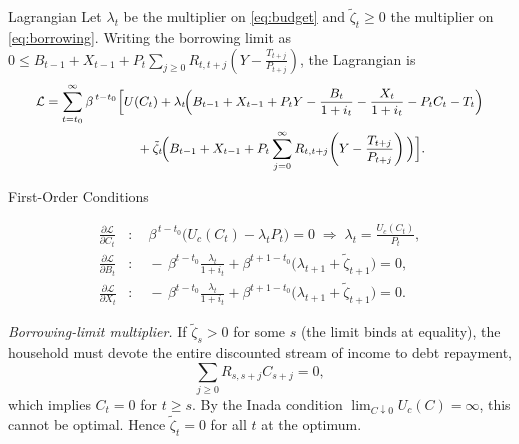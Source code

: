 \documentclass[11pt,aspectratio=169]{beamer}
\begin{document}
\begin{frame}{Lagrangian}
Let $\lambda_t$ be the multiplier on \eqref{eq:budget} and $\tilde{\zeta}_t \ge 0$ the multiplier on \eqref{eq:borrowing}.
Writing the borrowing limit as $0 \le B_{t-1} + X_{t-1} + P_t \sum_{j\ge 0} R_{t,t+j}\!\left(Y-\frac{T_{t+j}}{P_{t+j}}\right)$,
the Lagrangian is
\begin{equation} \label{eq:lagrangian}
\small
\begin{aligned}
\mathcal{L} 
= \sum_{t=t_0}^{\infty} \beta^{\,t-t_0}\Big[ & U(C_t) 
+ \lambda_t \!\Big(B_{t-1}+X_{t-1}+P_t Y - \frac{B_t}{1+i_t} - \frac{X_t}{1+i_t} - P_t C_t - T_t \Big) \\
&\quad + \tilde{\zeta}_t \!\Big( B_{t-1} + X_{t-1} 
+ P_t \sum_{j=0}^{\infty} R_{t,t+j} \!\left( Y - \frac{T_{t+j}}{P_{t+j}} \right) \Big) \Big].
\end{aligned}
\end{equation}
\end{frame}

\begin{frame}{First-Order Conditions}
\small

\begin{align}
\frac{\partial \mathcal{L}}{\partial C_t} &: \quad 
\beta^{\,t-t_0}\!\big(U_c(C_t)-\lambda_t P_t\big)=0 
\;\Rightarrow\;
\lambda_t=\frac{U_c(C_t)}{P_t}, 
\label{eq:foc_c}\\[1mm]
\frac{\partial \mathcal{L}}{\partial B_t} &: \quad 
-\,\beta^{t-t_0}\frac{\lambda_t}{1+i_t}
+\beta^{t+1-t_0}\big(\lambda_{t+1}+\tilde{\zeta}_{t+1}\big)=0,
\label{eq:foc_b}\\[1mm]
\frac{\partial \mathcal{L}}{\partial X_t} &: \quad 
-\,\beta^{t-t_0}\frac{\lambda_t}{1+i_t}
+\beta^{t+1-t_0}\big(\lambda_{t+1}+\tilde{\zeta}_{t+1}\big)=0.
\label{eq:foc_x}
\end{align}

\vspace{0.3cm}
\scriptsize
\textit{Borrowing-limit multiplier.}  
If $\tilde{\zeta}_s>0$ for some $s$ (the limit binds at equality), the household must devote the entire discounted stream of income to debt repayment,
\[
\sum_{j\ge0}R_{s,s+j}C_{s+j}=0,
\]
which implies $C_t=0$ for $t\ge s$.  
By the Inada condition $\lim_{C\downarrow0}U_c(C)=\infty$, this cannot be optimal.  
Hence $\tilde{\zeta}_t=0$ for all $t$ at the optimum.
\end{frame}
\end{document}
